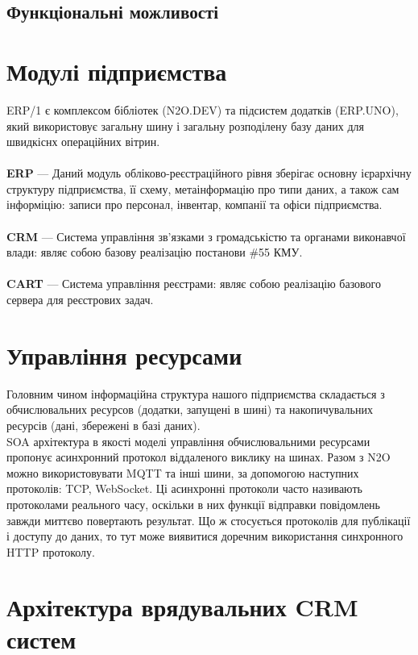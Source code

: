 \subsection{Функціональні можливості}

\newpage
\section{Модулі підприємства}

ERP/1 є комплексом бібліотек (N2O.DEV) та підсистем додатків (ERP.UNO),
який використовує загальну шину і загальну розподілену базу даних для швидкіснх операційних вітрин.
\\
\\
\textbf{ERP} — Даний модуль обліково-реєстраційного рівня зберігає основну ієрархічну структуру
        підприємства, її схему, метаінформацію про типи даних, а також сам інформіцію:
        записи про персонал, інвентар, компанії та офіси підприємства.
\\
\\
\textbf{CRM} — Система управління зв'язками з громадськістю та органами виконавчої влади:
        являє собою базову реалізацію постанови \#55 КМУ.
\\
\\
\textbf{CART} — Система управління реєстрами: являє собою реалізацію
           базового сервера для реєстрових задач.

\newpage
\section{Управління ресурсами}

Головним чином інформаційна структура нашого підприємства
складається з обчислювальних ресурсов (додатки, запущені в шині)
та накопичувальних ресурсів (дані, збережені в базі даних).
\
\\
SOA архітектура в якості моделі управління обчислювальними
ресурсами пропонує асинхронний протокол віддаленого виклику на шинах.
Разом з N2O можно використовувати MQTT та інші шини, за допомогою наступних протоколів: TCP, WebSocket.
Ці асинхронні протоколи часто називають
протоколами реального часу, оскільки в них функції відправки повідомлень завжди
миттєво повертають результат. Що ж стосується протоколів для публікації і доступу
до даних, то тут може виявитися доречним використання синхронного HTTP протоколу.

\newpage
\section{Архітектура врядувальних CRM систем}

